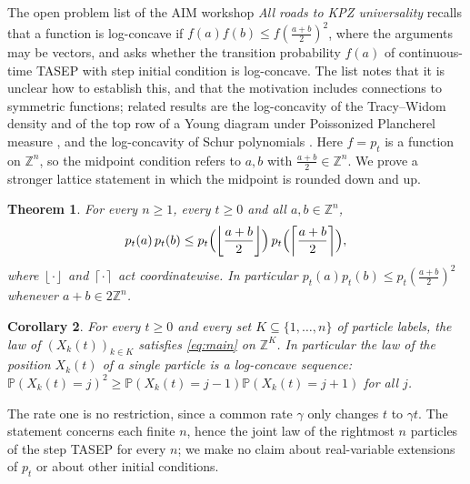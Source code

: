 \documentclass[11pt]{amsart}
\newtheorem{theorem}{Theorem}[section]
\newtheorem{corollary}[theorem]{Corollary}
\theoremstyle{remark}
\numberwithin{equation}{section}
\newcommand{\Pp}{\mathbb P}
\newcommand{\1}{\mathbf 1}
\newcommand{\Z}{\mathbb Z}
\newcommand{\fl}[1]{\left\lfloor #1\right\rfloor}
\newcommand{\cl}[1]{\left\lceil #1\right\rceil}
\begin{document}
The open problem list of the AIM workshop \emph{All roads to KPZ universality} \cite{AIM} recalls that a function is log-concave if $f(a)f(b)\le f(\frac{a+b}2)^2$, where the arguments may be vectors, and asks whether the transition probability $f(a)$ of continuous-time TASEP with step initial condition is log-concave. The list notes that it is unclear how to establish this, and that the motivation includes connections to symmetric functions; related results are the log-concavity of the Tracy--Widom density \cite{BLS} and of the top row of a Young diagram under Poissonized Plancherel measure \cite{BKM}, and the log-concavity of Schur polynomials \cite{HMMS}. Here $f=p_t$ is a function on $\Z^n$, so the midpoint condition refers to $a,b$ with $\frac{a+b}2\in\Z^n$. We prove a stronger lattice statement in which the midpoint is rounded down and up.

\begin{theorem}\label{thm:main}
For every $n\ge1$, every $t\ge0$ and all $a,b\in\Z^n$,
\begin{equation}\label{eq:main}
p_t(a)\,p_t(b)\le p_t\Bigl(\fl{\frac{a+b}2}\Bigr)\,p_t\Bigl(\cl{\frac{a+b}2}\Bigr),
\end{equation}
where $\fl{\cdot}$ and $\cl{\cdot}$ act coordinatewise. In particular $p_t(a)p_t(b)\le p_t(\frac{a+b}2)^2$ whenever $a+b\in2\Z^n$.
\end{theorem}

\begin{corollary}\label{cor:coord}
For every $t\ge0$ and every set $K\subseteq\{1,\dots,n\}$ of particle labels, the law of $(X_k(t))_{k\in K}$ satisfies \eqref{eq:main} on $\Z^K$. In particular the law of the position $X_k(t)$ of a single particle is a log-concave sequence: $\Pp(X_k(t)=j)^2\ge\Pp(X_k(t)=j-1)\Pp(X_k(t)=j+1)$ for all $j$.
\end{corollary}

The rate one is no restriction, since a common rate $\gamma$ only changes $t$ to $\gamma t$. The statement concerns each finite $n$, hence the joint law of the rightmost $n$ particles of the step TASEP for every $n$; we make no claim about real-variable extensions of $p_t$ or about other initial conditions.
\end{document}
